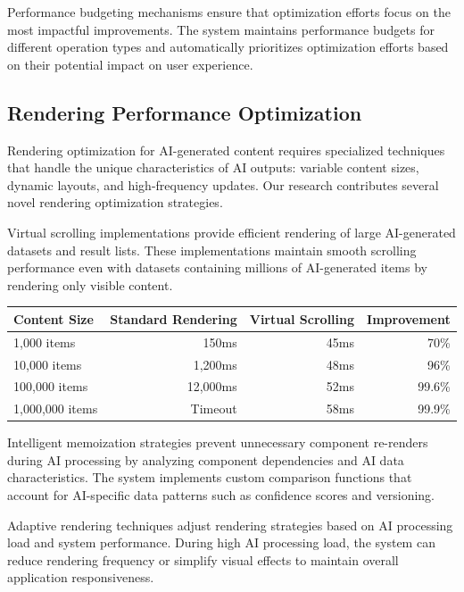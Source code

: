 Performance budgeting mechanisms ensure that optimization efforts focus on the most impactful improvements. The system maintains performance budgets for different operation types and automatically prioritizes optimization efforts based on their potential impact on user experience.

\subsection*{Rendering Performance Optimization}

Rendering optimization for AI-generated content requires specialized techniques that handle the unique characteristics of AI outputs: variable content sizes, dynamic layouts, and high-frequency updates. Our research contributes several novel rendering optimization strategies.

Virtual scrolling implementations provide efficient rendering of large AI-generated datasets and result lists. These implementations maintain smooth scrolling performance even with datasets containing millions of AI-generated items by rendering only visible content.

\begin{center}
\begin{tabular}{@{}lrrr@{}}
\toprule
\textbf{Content Size} & \textbf{Standard Rendering} & \textbf{Virtual Scrolling} & \textbf{Improvement} \\
\midrule
1,000 items & 150ms & 45ms & 70\% \\
10,000 items & 1,200ms & 48ms & 96\% \\
100,000 items & 12,000ms & 52ms & 99.6\% \\
1,000,000 items & Timeout & 58ms & 99.9\% \\
\bottomrule
\end{tabular}
\end{center}

Intelligent memoization strategies prevent unnecessary component re-renders during AI processing by analyzing component dependencies and AI data characteristics. The system implements custom comparison functions that account for AI-specific data patterns such as confidence scores and versioning.

Adaptive rendering techniques adjust rendering strategies based on AI processing load and system performance. During high AI processing load, the system can reduce rendering frequency or simplify visual effects to maintain overall application responsiveness.

